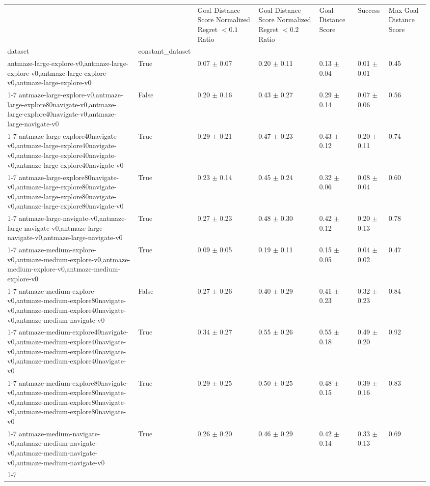 \begin{tabular}{lllllll}
\toprule
 &  & Goal Distance Score Normalized Regret $< 0.1$ Ratio & Goal Distance Score Normalized Regret $< 0.2$ Ratio & Goal Distance Score & Success & Max Goal Distance Score \\
dataset & constant_dataset &  &  &  &  &  \\
\midrule
antmaze-large-explore-v0,antmaze-large-explore-v0,antmaze-large-explore-v0,antmaze-large-explore-v0 & True & 0.07 $\pm$ 0.07 & 0.20 $\pm$ 0.11 & 0.13 $\pm$ 0.04 & 0.01 $\pm$ 0.01 & 0.45 \\
\cline{1-7}
antmaze-large-explore-v0,antmaze-large-explore80navigate-v0,antmaze-large-explore40navigate-v0,antmaze-large-navigate-v0 & False & 0.20 $\pm$ 0.16 & 0.43 $\pm$ 0.27 & 0.29 $\pm$ 0.14 & 0.07 $\pm$ 0.06 & 0.56 \\
\cline{1-7}
antmaze-large-explore40navigate-v0,antmaze-large-explore40navigate-v0,antmaze-large-explore40navigate-v0,antmaze-large-explore40navigate-v0 & True & 0.29 $\pm$ 0.21 & 0.47 $\pm$ 0.23 & 0.43 $\pm$ 0.12 & 0.20 $\pm$ 0.11 & 0.74 \\
\cline{1-7}
antmaze-large-explore80navigate-v0,antmaze-large-explore80navigate-v0,antmaze-large-explore80navigate-v0,antmaze-large-explore80navigate-v0 & True & 0.23 $\pm$ 0.14 & 0.45 $\pm$ 0.24 & 0.32 $\pm$ 0.06 & 0.08 $\pm$ 0.04 & 0.60 \\
\cline{1-7}
antmaze-large-navigate-v0,antmaze-large-navigate-v0,antmaze-large-navigate-v0,antmaze-large-navigate-v0 & True & 0.27 $\pm$ 0.23 & 0.48 $\pm$ 0.30 & 0.42 $\pm$ 0.12 & 0.20 $\pm$ 0.13 & 0.78 \\
\cline{1-7}
antmaze-medium-explore-v0,antmaze-medium-explore-v0,antmaze-medium-explore-v0,antmaze-medium-explore-v0 & True & 0.09 $\pm$ 0.05 & 0.19 $\pm$ 0.11 & 0.15 $\pm$ 0.05 & 0.04 $\pm$ 0.02 & 0.47 \\
\cline{1-7}
antmaze-medium-explore-v0,antmaze-medium-explore80navigate-v0,antmaze-medium-explore40navigate-v0,antmaze-medium-navigate-v0 & False & 0.27 $\pm$ 0.26 & 0.40 $\pm$ 0.29 & 0.41 $\pm$ 0.23 & 0.32 $\pm$ 0.23 & 0.84 \\
\cline{1-7}
antmaze-medium-explore40navigate-v0,antmaze-medium-explore40navigate-v0,antmaze-medium-explore40navigate-v0,antmaze-medium-explore40navigate-v0 & True & 0.34 $\pm$ 0.27 & 0.55 $\pm$ 0.26 & 0.55 $\pm$ 0.18 & 0.49 $\pm$ 0.20 & 0.92 \\
\cline{1-7}
antmaze-medium-explore80navigate-v0,antmaze-medium-explore80navigate-v0,antmaze-medium-explore80navigate-v0,antmaze-medium-explore80navigate-v0 & True & 0.29 $\pm$ 0.25 & 0.50 $\pm$ 0.25 & 0.48 $\pm$ 0.15 & 0.39 $\pm$ 0.16 & 0.83 \\
\cline{1-7}
antmaze-medium-navigate-v0,antmaze-medium-navigate-v0,antmaze-medium-navigate-v0,antmaze-medium-navigate-v0 & True & 0.26 $\pm$ 0.20 & 0.46 $\pm$ 0.29 & 0.42 $\pm$ 0.14 & 0.33 $\pm$ 0.13 & 0.69 \\
\cline{1-7}
\bottomrule
\end{tabular}
